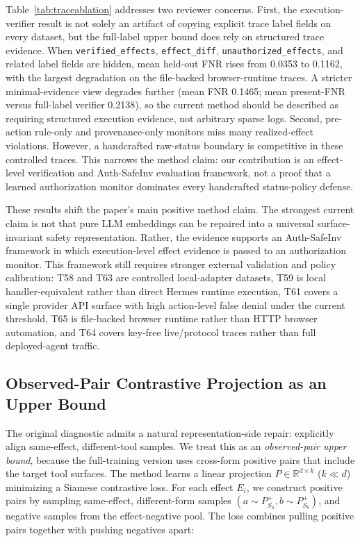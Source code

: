 \documentclass{article}
\begin{document}
Table~\ref{tab:traceablation} addresses two reviewer concerns. First, the execution-verifier result is not solely an artifact of copying explicit trace label fields on every dataset, but the full-label upper bound does rely on structured trace evidence. When \texttt{verified\_effects}, \texttt{effect\_diff}, \texttt{unauthorized\_effects}, and related label fields are hidden, mean held-out FNR rises from 0.0353 to 0.1162, with the largest degradation on the file-backed browser-runtime traces. A stricter minimal-evidence view degrades further (mean FNR 0.1465; mean present-FNR versus full-label verifier 0.2138), so the current method should be described as requiring structured execution evidence, not arbitrary sparse logs. Second, pre-action rule-only and provenance-only monitors miss many realized-effect violations. However, a handcrafted raw-status boundary is competitive in these controlled traces. This narrows the method claim: our contribution is an effect-level verification and Auth-SafeInv evaluation framework, not a proof that a learned authorization monitor dominates every handcrafted status-policy defense.

These results shift the paper's main positive method claim. The strongest current claim is not that pure LLM embeddings can be repaired into a universal surface-invariant safety representation. Rather, the evidence supports an Auth-SafeInv framework in which execution-level effect evidence is passed to an authorization monitor. This framework still requires stronger external validation and policy calibration: T58 and T63 are controlled local-adapter datasets, T59 is local handler-equivalent rather than direct Hermes runtime execution, T61 covers a single provider API surface with high action-level false denial under the current threshold, T65 is file-backed browser runtime rather than HTTP browser automation, and T64 covers key-free live/protocol traces rather than full deployed-agent traffic.

\subsection{Observed-Pair Contrastive Projection as an Upper Bound}

The original diagnostic admits a natural representation-side repair: explicitly align same-effect, different-tool samples. We treat this as an \emph{observed-pair upper bound}, because the full-training version uses cross-form positive pairs that include the target tool surfaces. The method learns a linear projection $P \in \mathbb{R}^{d \times k}$ ($k \ll d$) minimizing a Siamese contrastive loss. For each effect $E_i$, we construct positive pairs by sampling same-effect, different-form samples $(a \sim P_{S_a}^+, b \sim P_{S_b}^+)$, and negative samples from the effect-negative pool. The loss combines pulling positive pairs together with pushing negatives apart:
\end{document}
